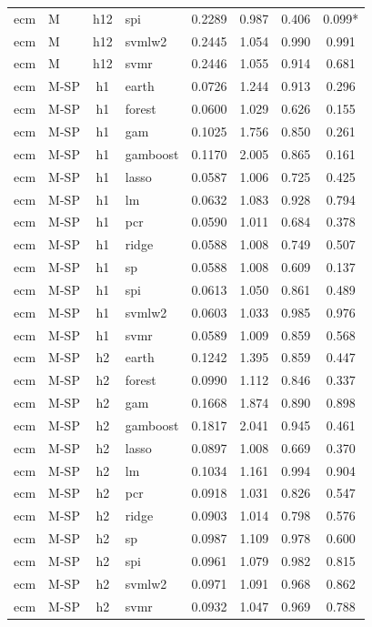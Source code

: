 \begin{ThreePartTable}
\begin{longtable}[t]{llclcccc}
ecm & M & h12 & spi & 0.2289 & 0.987 & 0.406 & 0.099*\\
ecm & M & h12 & svmlw2 & 0.2445 & 1.054 & 0.990 & 0.991\\
ecm & M & h12 & svmr & 0.2446 & 1.055 & 0.914 & 0.681\\
\addlinespace
ecm & M-SP & h1 & earth & 0.0726 & 1.244 & 0.913 & 0.296\\
ecm & M-SP & h1 & forest & 0.0600 & 1.029 & 0.626 & 0.155\\
ecm & M-SP & h1 & gam & 0.1025 & 1.756 & 0.850 & 0.261\\
ecm & M-SP & h1 & gamboost & 0.1170 & 2.005 & 0.865 & 0.161\\
ecm & M-SP & h1 & lasso & 0.0587 & 1.006 & 0.725 & 0.425\\
ecm & M-SP & h1 & lm & 0.0632 & 1.083 & 0.928 & 0.794\\
ecm & M-SP & h1 & pcr & 0.0590 & 1.011 & 0.684 & 0.378\\
ecm & M-SP & h1 & ridge & 0.0588 & 1.008 & 0.749 & 0.507\\
ecm & M-SP & h1 & sp & 0.0588 & 1.008 & 0.609 & 0.137\\
ecm & M-SP & h1 & spi & 0.0613 & 1.050 & 0.861 & 0.489\\
ecm & M-SP & h1 & svmlw2 & 0.0603 & 1.033 & 0.985 & 0.976\\
ecm & M-SP & h1 & svmr & 0.0589 & 1.009 & 0.859 & 0.568\\
\addlinespace
ecm & M-SP & h2 & earth & 0.1242 & 1.395 & 0.859 & 0.447\\
ecm & M-SP & h2 & forest & 0.0990 & 1.112 & 0.846 & 0.337\\
ecm & M-SP & h2 & gam & 0.1668 & 1.874 & 0.890 & 0.898\\
ecm & M-SP & h2 & gamboost & 0.1817 & 2.041 & 0.945 & 0.461\\
ecm & M-SP & h2 & lasso & 0.0897 & 1.008 & 0.669 & 0.370\\
ecm & M-SP & h2 & lm & 0.1034 & 1.161 & 0.994 & 0.904\\
ecm & M-SP & h2 & pcr & 0.0918 & 1.031 & 0.826 & 0.547\\
ecm & M-SP & h2 & ridge & 0.0903 & 1.014 & 0.798 & 0.576\\
ecm & M-SP & h2 & sp & 0.0987 & 1.109 & 0.978 & 0.600\\
ecm & M-SP & h2 & spi & 0.0961 & 1.079 & 0.982 & 0.815\\
ecm & M-SP & h2 & svmlw2 & 0.0971 & 1.091 & 0.968 & 0.862\\
ecm & M-SP & h2 & svmr & 0.0932 & 1.047 & 0.969 & 0.788\\

\end{longtable}
\end{ThreePartTable}
